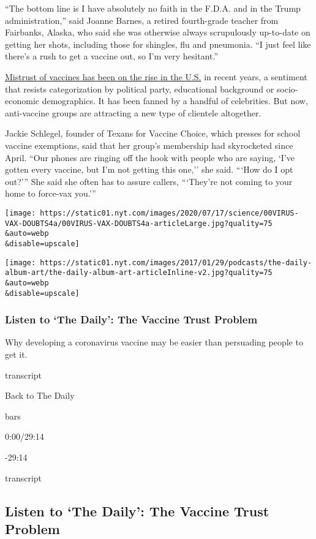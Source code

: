 ``The bottom line is I have absolutely no faith in the F.D.A. and in the
Trump administration,'' said Joanne Barnes, a retired fourth-grade
teacher from Fairbanks, Alaska, who said she was otherwise always
scrupulously up-to-date on getting her shots, including those for
shingles, flu and pneumonia. ``I just feel like there's a rush to get a
vaccine out, so I'm very hesitant.''

\href{https://www.nytimes.com/2019/09/23/health/anti-vaccination-movement-us.html}{Mistrust
of vaccines has been on the rise in the U.S.} in recent years, a
sentiment that resists categorization by political party, educational
background or socio-economic demographics. It has been fanned by a
handful of celebrities. But now, anti-vaccine groups are attracting a
new type of clientele altogether.

Jackie Schlegel, founder of Texans for Vaccine Choice, which presses for
school vaccine exemptions, said that her group's membership had
skyrocketed since April. ``Our phones are ringing off the hook with
people who are saying, `I've gotten every vaccine, but I'm not getting
this one,'' she said. ```How do I opt out?''' She said she often has to
assure callers, ```They're not coming to your home to force-vax you.'''

\texttt{[image: https://static01.nyt.com/images/2020/07/17/science/00VIRUS-VAX-DOUBTS4a/00VIRUS-VAX-DOUBTS4a-articleLarge.jpg?quality=75\\\&auto=webp\\\&disable=upscale]}

\texttt{[image: https://static01.nyt.com/images/2017/01/29/podcasts/the-daily-album-art/the-daily-album-art-articleInline-v2.jpg?quality=75\\\&auto=webp\\\&disable=upscale]}

\hypertarget{listen-to-the-daily-the-vaccine-trust-problem}{%
\subsubsection{Listen to `The Daily': The Vaccine Trust
Problem}\label{listen-to-the-daily-the-vaccine-trust-problem}}

Why developing a coronavirus vaccine may be easier than persuading
people to get it.

transcript

Back to The Daily

bars

0:00/29:14

-29:14

transcript

\hypertarget{listen-to-the-daily-the-vaccine-trust-problem-1}{%
\subsection{Listen to `The Daily': The Vaccine Trust
Problem}\label{listen-to-the-daily-the-vaccine-trust-problem-1}}

